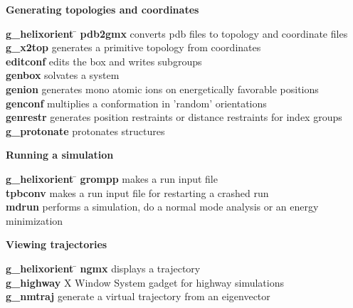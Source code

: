 \begin{description}
\item {\large\bf Generating topologies and coordinates}
\vspace{-2ex}\begin{tabbing}
{\bf g\_helixorient} \= \kill
{\bf pdb2gmx} \> converts pdb files to topology and coordinate files \\
{\bf g\_x2top} \> generates a primitive topology from coordinates  \\
{\bf editconf} \> edits the box and writes subgroups  \\
{\bf genbox} \> solvates a system \\
{\bf genion} \> generates mono atomic ions on energetically favorable positions \\
{\bf genconf} \> multiplies a conformation in 'random' orientations \\
{\bf genrestr} \> generates position restraints or distance restraints for index groups \\
{\bf g\_protonate} \> protonates structures \\
\end{tabbing}\vspace{-2ex}

\item {\large\bf Running a simulation}
\vspace{-2ex}\begin{tabbing}
{\bf g\_helixorient} \= \kill
{\bf grompp} \> makes a run input file \\
{\bf tpbconv} \> makes a run input file for restarting a crashed run \\
{\bf mdrun} \> performs a simulation, do a normal mode analysis or an energy minimization \\
\end{tabbing}\vspace{-2ex}

\item {\large\bf Viewing trajectories}
\vspace{-2ex}\begin{tabbing}
{\bf g\_helixorient} \= \kill
{\bf ngmx} \> displays a trajectory \\
{\bf g\_highway} \> X Window System gadget for highway simulations \\
{\bf g\_nmtraj} \> generate a virtual trajectory from an eigenvector \\
\end{tabbing}\vspace{-2ex}


\end{description}
